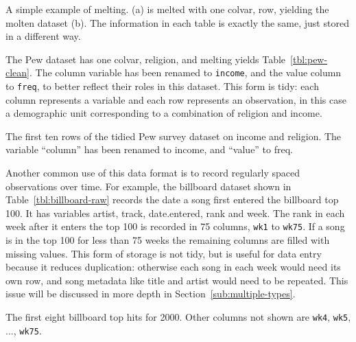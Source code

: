 \documentclass[article]{jss}
\begin{document}
\begin{table}
  \centering
  \hspace{2em}%

  \caption{A simple example of melting. (a) is melted with one colvar, row, yielding the molten dataset (b). The information in each table is exactly the same, just stored in a different way.}
  \label{tbl:melt} 
\end{table}

The Pew dataset has one colvar, religion, and melting yields Table~\ref{tbl:pew-clean}. The column variable has been renamed to {\tt income}, and the value column to {\tt freq}, to better reflect their roles in this dataset. This form is tidy: each column represents a variable and each row represents an observation, in this case a demographic unit corresponding to a combination of religion and income.

\begin{table}[htbp]
  \centering
  
  \caption{The first ten rows of the tidied Pew survey dataset on income and religion. The variable ``column'' has been renamed to income, and ``value'' to freq.}
  \label{tbl:pew-clean}
\end{table}

Another common use of this data format is to record regularly spaced observations over time. For example, the billboard dataset shown in Table~\ref{tbl:billboard-raw} records the date a song first entered the billboard top 100. It has variables artist, track, date.entered, rank and week. The rank in each week after it enters the top 100 is recorded in 75 columns, {\tt wk1} to {\tt wk75}. If a song is in the top 100 for less than 75 weeks the remaining columns are filled with missing values.  This form of storage is not tidy, but is useful for data entry because it reduces duplication: otherwise each song in each week would need its own row, and song metadata like title and artist would need to be repeated. This issue will be discussed in more depth in Section~\ref{sub:multiple-types}.

\begin{table}[htbp]
  \centering
  
  \caption{The first eight billboard top hits for 2000. Other columns not shown are {\tt wk4}, {\tt wk5}, ..., {\tt wk75}.}
  \label{tbl:billboard-raw}
\end{table}
\end{document}
